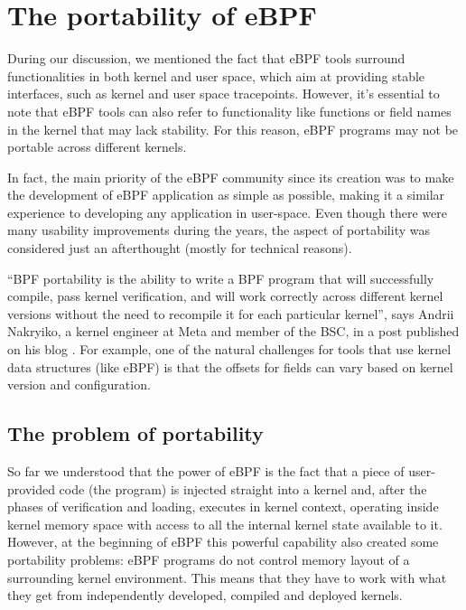 \section{The portability of eBPF}

During our discussion, we mentioned the fact that eBPF tools surround functionalities in both kernel and user space, which aim at providing stable interfaces, such as kernel and user space tracepoints. 
However, it's essential to note that eBPF tools can also refer to functionality like functions or field names in the kernel that may lack stability. 
For this reason, eBPF programs may not be portable across different kernels.

In fact, the main priority of the eBPF community since its creation was to make the development of eBPF application as simple as possible, making it a similar experience to developing any application in user-space.
Even though there were many usability improvements during the years, the aspect of portability was considered just an afterthought (mostly for technical reasons).

``BPF portability is the ability to write a BPF program that will successfully compile, pass kernel verification, and will work correctly across different kernel versions without the need to recompile it for each particular kernel'', says Andrii Nakryiko, a kernel engineer at Meta and member of the BSC, in a post \cite{ANCOREPost} published on his blog \cite{ANBlog}.
For example, one of the natural challenges for tools that use kernel data structures (like eBPF) is that the offsets for fields can vary based on kernel version and configuration.

\subsection{The problem of portability}

So far we understood that the power of eBPF is the fact that a piece of user-provided code (the program) is injected straight into a kernel and, after the phases of verification and loading, executes in kernel context, operating inside kernel memory space with access to all the internal kernel state available to it. 
However, at the beginning of eBPF this powerful capability also created some portability problems: eBPF programs do not control memory layout of a surrounding kernel environment. 
This means that they have to work with what they get from independently developed, compiled and deployed kernels.

